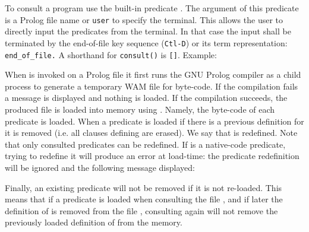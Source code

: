 To consult a program use the built-in predicate 
. The argument of this predicate is a Prolog file name or
\texttt{user} to specify the terminal. This allows the user to directly input
the predicates from the terminal. In that case the input shall be terminated
by the end-of-file key sequence (\texttt{Ctl-D}) or its term representation:
\texttt{end\_of\_file.} A shorthand for 
\texttt{consult(}\texttt{)} is
\texttt{[}\texttt{]}. Example:

\begin{CodeTwoCols}
\SkipLine
{}
\SkipLine
{}
\SkipLine
{}
\SkipLine
{}
\SkipLine
{}
\SkipLine
{}
\end{CodeTwoCols}

When   is invoked on a Prolog file it
first runs the GNU Prolog compiler  as a child
process to generate a temporary WAM file for byte-code. If the compilation
fails a message is displayed and nothing is loaded. If the compilation
succeeds, the produced file is loaded into memory using 
. Namely, the byte-code of each predicate is loaded. When a
predicate  is loaded if there is a previous definition
for  it is removed (i.e. all clauses defining
 are erased). We say that  is
redefined. Note that only consulted predicates can be redefined. If
 is a native-code predicate, trying to redefine it will
produce an error at load-time: the predicate redefinition will be ignored
and the following message displayed: 


Finally, an existing predicate will not be removed if it is not re-loaded.
This means that if a predicate  is loaded when consulting
the file , and if later the definition of
 is removed from the file , consulting
 again will not remove the previously loaded definition
of  from the memory.

